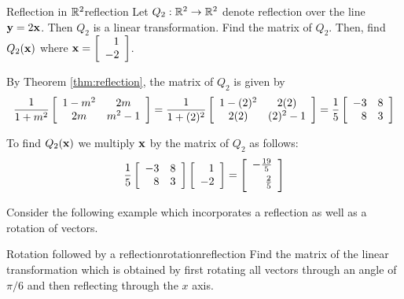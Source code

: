\begin{example}{Reflection in $\mathbb{R}^2$}{reflection}
Let $Q_2: \mathbb{R}^2 \to \mathbb{R}^2$ denote reflection over the line ${\bf y}=2{\bf x}$. Then $Q_2$ is a linear transformation. Find the matrix of $Q_2$. Then, find $Q_2 ({\bf x})$ where ${\bf x} = \left[ 
\begin{array}{r}
1 \\
-2
\end{array}
\right]$. 
\end{example}

\begin{solution}
By Theorem \ref{thm:reflection}, the matrix of $Q_2$ is given by 
\[
\frac{1}{1+m^2}
\left[
\begin{array}{cc}
1-m^2 & 2m \\
2m & m^2-1 
\end{array}
\right]
=
\frac{1}{1+(2)^2}
\left[
\begin{array}{cc}
1-(2)^2 & 2(2) \\
2(2) & (2)^2-1 
\end{array}
\right]
=
\frac{1}{5}
\left[
\begin{array}{rr}
-3 & 8 \\
8 & 3 
\end{array}
\right]
\]

To find $Q_2({\bf x})$ we multiply ${\bf x}$ by the matrix of $Q_2$ as follows:
\[
\frac{1}{5}
\leftB
\begin{array}{rr}
-3 & 8 \\
8 & 3 
\end{array}
\rightB
\leftB
\begin{array}{r}
1 \\
-2
\end{array}
\rightB
=
\leftB
\begin{array}{r}
-\vspace{0.05in}\frac{19}{5} \\
\vspace{0.05in}\frac{2}{5}
\end{array}
\rightB
\]

\end{solution}

Consider the following example which incorporates a reflection as well as a rotation of vectors.

\begin{example}{Rotation followed by a reflection}{rotationreflection}
Find the matrix of the linear transformation which is obtained by first
rotating all vectors through an angle of $\pi /6$ and then reflecting
through the $x$ axis.
\end{example}

